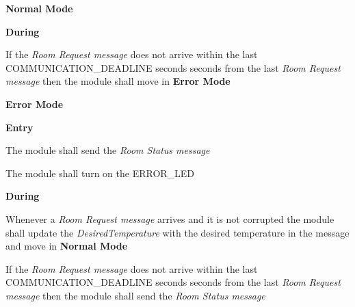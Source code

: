 \begin{req_enum}
\begin{req_enum}[label*=\arabic*.]
					\item \textbf{Normal Mode}
						\begin{req_enum}[label*=\arabic*.]							
							\item \textbf{During}
								\begin{req_enum}[label*=\arabic*.]
									\item If the \textit{Room Request message} does not arrive within the last COMMUNICATION\_DEADLINE seconds  seconds from the last \textit{Room Request message} then the module shall move in \textbf{Error Mode}
								\end{req_enum}
							\end{req_enum}

					\item \textbf{Error Mode}
						\begin{req_enum}[label*=\arabic*.]
							\item \textbf{Entry}
								\begin{req_enum}[label*=\arabic*.]
									\item The module shall send the \textit{Room Status message}
									\item The module shall turn on the ERROR\_LED
								\end{req_enum}

							\item \textbf{During}
							\begin{req_enum}[label*=\arabic*.]
								\item Whenever a \textit{Room Request message} arrives and it is not corrupted the module shall update the \textit{DesiredTemperature} with the desired temperature in the message and move in \textbf{Normal Mode}
								\item If the \textit{Room Request message} does not arrive within the last COMMUNICATION\_DEADLINE seconds  seconds from the last \textit{Room Request message} then the module shall send the \textit{Room Status message}
							\end{req_enum}


\end{req_enum}
\end{req_enum}
\end{req_enum}
